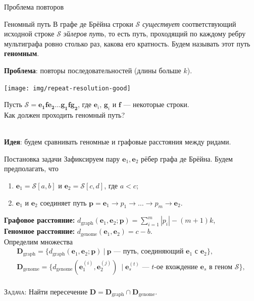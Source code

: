 \documentclass[unicode, notheorems]{beamer}
\begin{document}
\begin{frame}{Проблема повторов}
\begin{block}{Геномный путь}
	В графе де Брёйна строки $\mathcal{S}$ \textit{существует} соответствующий исходной строке $\mathcal{S}$ \textit{эйлеров путь}, то есть путь, проходящий по каждому ребру мультиграфа ровно столько раз, какова его кратность. Будем называть этот путь \textbf{геномным}.
\end{block}

\textbf{Проблема}: повторы последовательностей (длины больше $k$).\\
\bigskip
\begin{minipage}{0.55\textwidth}
	\texttt{[image: img/repeat-resolution-good]}
\end{minipage}%
\begin{minipage}{0.45\textwidth}
	Пусть $\mathcal{S} = \mathbf{e_1 f e_2 \ldots g_1 f g_2}$, где $\mathbf{e}_i$, $\mathbf{g}_i$ и $\mathbf{f}$ --- некоторые строки.\\
	{\color{blue} Как должен проходить геномный путь?}
\end{minipage}\\
\bigskip
\textbf{Идея}:  будем сравнивать геномные и графовые расстояния между ридами.

\end{frame}

\begin{frame}{Постановка задачи}
	Зафиксируем пару $\mathbf{e}_1, \mathbf{e}_2$ рёбер графа де Брёйна. Будем предполагать, что
	\begin{enumerate}
		\item  $\mathbf{e}_1 = \mathcal{S}[a, b]$ и $\mathbf{e}_2 = \mathcal{S}[c, d]$, где $a < c$;
		\item $\mathbf{e}_1$ и $\mathbf{e}_2$ соединяет путь $\bm p =  \mathbf{e}_1 \to p_1 \to \ldots \to p_m \to \mathbf{e}_2$.
	\end{enumerate}
	\bigskip
	{\bf Графовое расстояние:} $d_{\mathrm{graph}} (\mathbf{e}_1, \mathbf{e}_2; \bm p) = \sum_{i=1}^m |p_i| - (m+1)k$,\\
	\medskip
 	{\bf Геномное расстояние:} $d_{\mathrm{genome}}(\mathbf{e}_1, \mathbf{e}_2) = c - b$.\\
 	\bigskip
	Определим множества
	\begin{gather*}
		\mathbf{D}_{\mathrm{graph}} = \big\{ d_{\mathrm{graph}} (\mathbf{e}_1, \mathbf{e}_2; \bm p)\  |\  \bm p \text{ --- путь, соединяющий } \mathbf{e}_1 \text{ с } \mathbf{e}_2  \big\} , \\
		\mathbf{D}_{\mathrm{genome}} = \big\{  d_{\mathrm{genome}}(\mathbf{e}_1^{(i)}, \mathbf{e}_2^{(j)})\ \mid \mathbf{e}_s^{(t)} \text{ --- } t \text{-ое вхождение } \mathbf{e}_s \text{ в геном } \mathcal{S} \big\},
	\end{gather*}\\ 
	\textsc{ \large \color{blue} Задача:}
	Найти пересечение $\mathbf{D} = \mathbf{D}_{\mathrm{graph}} \cap \mathbf{D}_{\mathrm{genome}}$.
	\end{frame}
\end{document}
